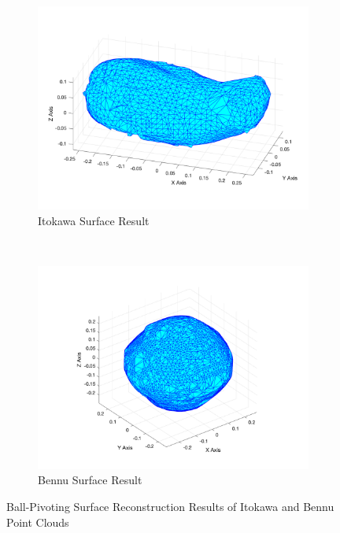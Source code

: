 \begin{figure}[ht!]
    \centering
    \begin{subfigure}[t]{0.5\textwidth}
        \centering
        \includegraphics[width = 1\textwidth]{fig/itokawa_recon.png}
        \caption{Itokawa Surface Result}
    \end{subfigure}%
    ~ 
    \begin{subfigure}[t]{0.5\textwidth}
        \centering
        \includegraphics[width = 1\textwidth]{fig/bennu_recon.png}
        \caption{Bennu Surface Result}
    \end{subfigure}
    \caption{Ball-Pivoting Surface Reconstruction Results of Itokawa and Bennu Point Clouds}
    \label{fig:twosurfaces}
\end{figure}
